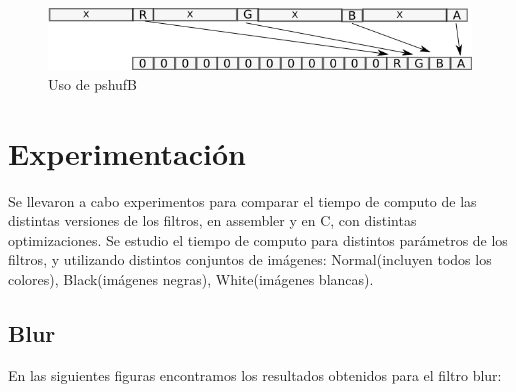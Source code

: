 \documentclass[a4paper]{article}
\begin{document}
\begin{figure}[H]
\centering
\includegraphics[scale=0.8]{imagenes/shufle.png}
\caption{Uso de pshufB}
\label{lshValue}
\end{figure}



\section{Experimentación}

Se llevaron a cabo experimentos para comparar el tiempo de computo de las distintas versiones de los filtros, en assembler y en C, con distintas optimizaciones. Se estudio el tiempo de computo para distintos parámetros de los filtros, y utilizando distintos conjuntos de imágenes: Normal(incluyen todos los colores), Black(imágenes negras), White(imágenes blancas).


\subsection{Blur}

En las siguientes figuras encontramos los resultados obtenidos para el filtro blur:
\end{document}
